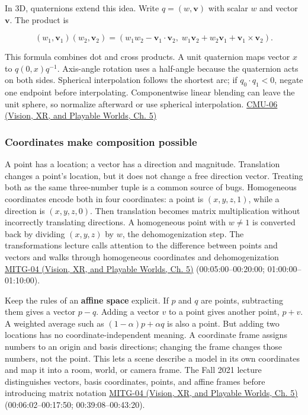 In 3D, quaternions extend this idea. Write \(q=(w,\mathbf v)\) with scalar \(w\) and vector \(\mathbf v\). The product is

\[
(w_1,\mathbf v_1)(w_2,\mathbf v_2)=
(w_1w_2-\mathbf v_1\cdot\mathbf v_2,\;w_1\mathbf v_2+w_2\mathbf v_1+\mathbf v_1\times\mathbf v_2).
\]

This formula combines dot and cross products. A unit quaternion maps vector \(x\) to \(q(0,x)q^{-1}\). Axis-angle rotation uses a half-angle because the quaternion acts on both sides. Spherical interpolation follows the shortest arc; if \(q_0\cdot q_1<0\), negate one endpoint before interpolating. Componentwise linear blending can leave the unit sphere, so normalize afterward or use spherical interpolation. \href{../07-Vision-XR-and-Playable-Worlds/main.pdf\#nameddest=04-visual-computing-ii-ch036-cmu-06---3d-rotations-and-complex-representations}{CMU-06 (Vision, XR, and Playable Worlds, Ch. 5)}

\subsubsection{Coordinates make composition possible}\label{03-visual-computing-i-ch001-coordinates-make-composition-possible}

\hypertarget{03-visual-computing-i-ch001-coordinates-make-composition-possible}{}

A point has a location; a vector has a direction and magnitude. Translation changes a point's location, but it does not change a free direction vector. Treating both as the same three-number tuple is a common source of bugs. Homogeneous coordinates encode both in four coordinates: a point is \((x,y,z,1)\), while a direction is \((x,y,z,0)\). Then translation becomes matrix multiplication without incorrectly translating directions. A homogeneous point with \(w\ne 1\) is converted back by dividing \((x,y,z)\) by \(w\), the dehomogenization step. The transformations lecture calls attention to the difference between points and vectors and walks through homogeneous coordinates and dehomogenization \href{../07-Vision-XR-and-Playable-Worlds/main.pdf\#nameddest=04-visual-computing-ii-ch036-mitg-04---transformations}{MITG-04 (Vision, XR, and Playable Worlds, Ch. 5)} (00:05:00--00:20:00; 01:00:00--01:10:00).

Keep the rules of an \textbf{affine space} explicit. If \(p\) and \(q\) are points, subtracting them gives a vector \(p-q\). Adding a vector \(v\) to a point gives another point, \(p+v\). A weighted average such as \((1-\alpha)p+\alpha q\) is also a point. But adding two locations has no coordinate-independent meaning. A coordinate frame assigns numbers to an origin and basis directions; changing the frame changes those numbers, not the point. This lets a scene describe a model in its own coordinates and map it into a room, world, or camera frame. The Fall 2021 lecture distinguishes vectors, basis coordinates, points, and affine frames before introducing matrix notation \href{../07-Vision-XR-and-Playable-Worlds/main.pdf\#nameddest=04-visual-computing-ii-ch036-mitg-04---transformations}{MITG-04 (Vision, XR, and Playable Worlds, Ch. 5)} (00:06:02--00:17:50; 00:39:08--00:43:20).

